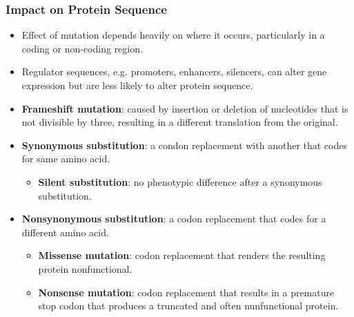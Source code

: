 \documentclass[12pt,a4paper]{article}
\begin{document}
\begin{itemize}
    \subsubsection{Impact on Protein Sequence}
    \begin{itemize}
        \item Effect of mutation depends heavily on where it occurs, particularly in a coding or non-coding region.
        \item Regulator sequences, e.g. promoters, enhancers, silencers, can alter gene expression but are less likely to alter protein sequence.
        \item \textbf{Frameshift mutation}: caused by insertion or deletion of nucleotides that is not divisible by three, resulting in a different translation from the original.
        \item \textbf{Synonymous substitution}: a condon replacement with another that codes for same amino acid. 
            \begin{itemize}
                \item \textbf{Silent substitution}: no phenotypic difference after a synonymous substitution.
            \end{itemize}
        \item \textbf{Nonsynonymous substitution}: a codon replacement that codes for a different amino acid.
            \begin{itemize}
                \item \textbf{Missense mutation}: codon replacement that renders the resulting protein nonfunctional.
                \item \textbf{Nonsense mutation}: codon replacement that results in a premature stop codon that produces a truncated and often nunfunctional protein.
            \end{itemize}
    \end{itemize}
\end{itemize}
\end{document}
